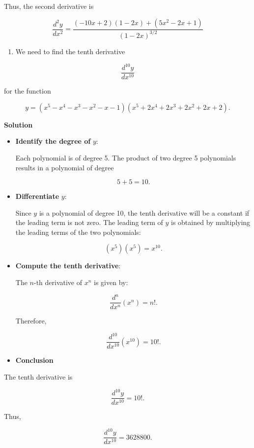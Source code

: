 \documentclass[
]{book}
\providecommand{\tightlist}{%
  \setlength{\itemsep}{0pt}\setlength{\parskip}{0pt}}
\begin{document}
Thus, the second derivative is

\[
\frac{d^2y}{dx^2} = \frac{(-10x + 2)(1 - 2x) + (5x^2 - 2x + 1)}{(1 - 2x)^{3/2}}
\]

\begin{enumerate}
\def\labelenumi{\arabic{enumi}.}
\setcounter{enumi}{9}
\tightlist
\item
  We need to find the tenth derivative
\end{enumerate}

\[
\frac{d^{10}y}{dx^{10}}
\]

for the function

\[
y = (x^5 - x^4 - x^3 - x^2 - x - 1)(x^5 + 2x^4 + 2x^3 + 2x^2 + 2x + 2).
\]

\textbf{Solution}

\begin{itemize}
\item
  \textbf{Identify the degree of} \(y\):

  Each polynomial is of degree 5. The product of two degree 5
  polynomials results in a polynomial of degree

  \[
  5 + 5 = 10.
  \]
\item
  \textbf{Differentiate} \(y\):

  Since \(y\) is a polynomial of degree 10, the tenth derivative will be
  a constant if the leading term is not zero. The leading term of \(y\)
  is obtained by multiplying the leading terms of the two polynomials:

  \[
  (x^5)(x^5) = x^{10}.
  \]
\item
  \textbf{Compute the tenth derivative}:

  The \(n\)-th derivative of \(x^n\) is given by:

  \[
  \frac{d^n}{dx^n}(x^n) = n!.
  \]

  Therefore,

  \[
  \frac{d^{10}}{dx^{10}}(x^{10}) = 10!.
  \]
\item
  \textbf{Conclusion}
\end{itemize}

The tenth derivative is

\[
\frac{d^{10}y}{dx^{10}} = 10!.
\]

Thus,

\[
\frac{d^{10}y}{dx^{10}} = 3628800.
\]

\backmatter
\end{document}
